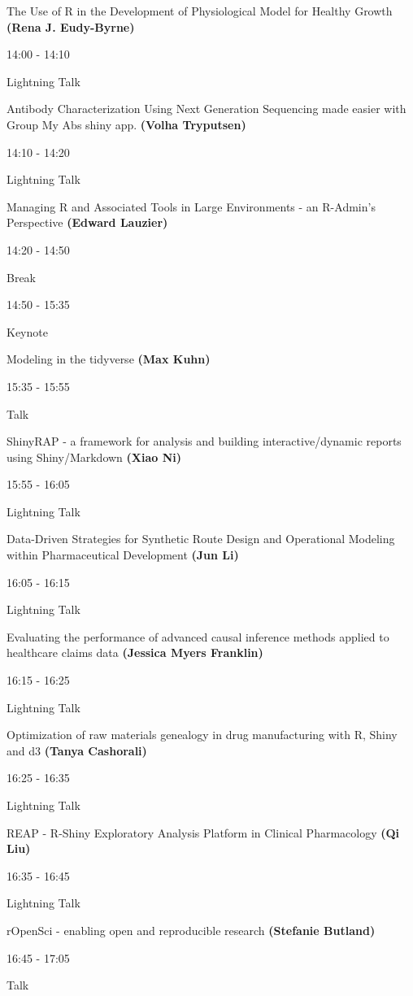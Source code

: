 \documentclass[]{book}
\theoremstyle{definition}
\theoremstyle{definition}
\theoremstyle{definition}
\theoremstyle{remark}
\begin{document}
The Use of R in the Development of Physiological Model for Healthy
Growth \textbf{(Rena J. Eudy-Byrne)}

14:00 - 14:10

Lightning Talk

Antibody Characterization Using Next Generation Sequencing made easier
with Group My Abs shiny app. \textbf{(Volha Tryputsen)}

14:10 - 14:20

Lightning Talk

Managing R and Associated Tools in Large Environments - an R-Admin's
Perspective \textbf{(Edward Lauzier)}

14:20 - 14:50

Break

14:50 - 15:35

Keynote

Modeling in the tidyverse \textbf{(Max Kuhn)}

15:35 - 15:55

Talk

ShinyRAP - a framework for analysis and building interactive/dynamic
reports using Shiny/Markdown \textbf{(Xiao Ni)}

15:55 - 16:05

Lightning Talk

Data-Driven Strategies for Synthetic Route Design and Operational
Modeling within Pharmaceutical Development \textbf{(Jun Li)}

16:05 - 16:15

Lightning Talk

Evaluating the performance of advanced causal inference methods applied
to healthcare claims data \textbf{(Jessica Myers Franklin)}

16:15 - 16:25

Lightning Talk

Optimization of raw materials genealogy in drug manufacturing with R,
Shiny and d3 \textbf{(Tanya Cashorali)}

16:25 - 16:35

Lightning Talk

REAP - R-Shiny Exploratory Analysis Platform in Clinical Pharmacology
\textbf{(Qi Liu)}

16:35 - 16:45

Lightning Talk

rOpenSci - enabling open and reproducible research \textbf{(Stefanie
Butland)}

16:45 - 17:05

Talk
\end{document}
